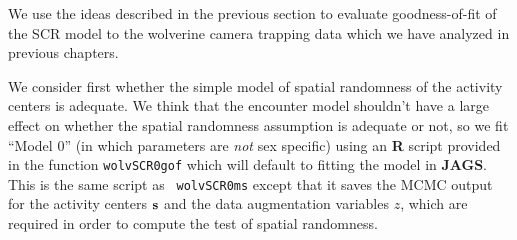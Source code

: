 We use the ideas described in the previous section to evaluate
goodness-of-fit of the SCR model to the wolverine camera trapping data
which we have analyzed in previous chapters.

We consider first whether the simple model of spatial randomness of
the activity centers is adequate.  We think that the
 encounter model shouldn't have a large  effect on
whether the spatial randomness assumption is adequate or not, so we
fit ``Model 0'' (in which parameters are {\it not} sex specific)
using an {\bf R} script provided
in the function \mbox{\tt wolvSCR0gof} which will default to fitting
the model in {\bf JAGS}.  This is the same script as \mbox{\tt
  wolvSCR0ms} except that it saves the MCMC output for the activity
centers ${\bf s}$ and the data augmentation variables $z$, which are
required in order to compute the test of spatial randomness.

